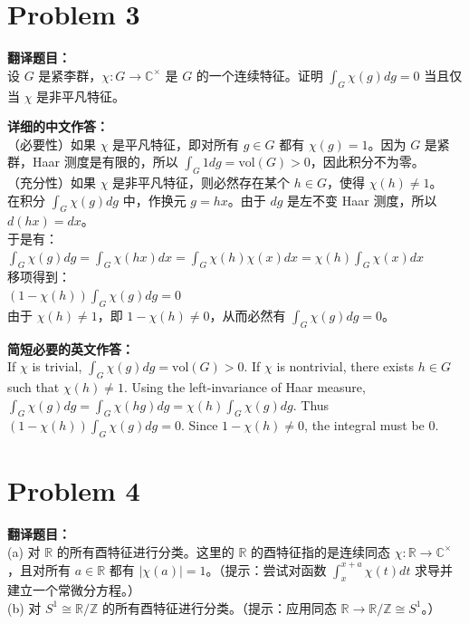 \documentclass{ctexart}
\begin{document}
\vspace{2em}
\section*{Problem 3}
\textbf{翻译题目：}\\
设 $G$ 是紧李群，$\chi: G \to \mathbb{C}^\times$ 是 $G$ 的一个连续特征。证明 $\int_G \chi(g) dg = 0$ 当且仅当 $\chi$ 是非平凡特征。

\vspace{1em}
\textbf{详细的中文作答：}\\
（必要性）如果 $\chi$ 是平凡特征，即对所有 $g \in G$ 都有 $\chi(g) = 1$。因为 $G$ 是紧群，Haar 测度是有限的，所以 $\int_G 1 dg = \text{vol}(G) > 0$，因此积分不为零。\\
（充分性）如果 $\chi$ 是非平凡特征，则必然存在某个 $h \in G$，使得 $\chi(h) \neq 1$。\\
在积分 $\int_G \chi(g) dg$ 中，作换元 $g = hx$。由于 $dg$ 是左不变 Haar 测度，所以 $d(hx) = dx$。\\
于是有：\\
$\int_G \chi(g) dg = \int_G \chi(hx) dx = \int_G \chi(h)\chi(x) dx = \chi(h) \int_G \chi(x) dx$\\
移项得到：\\
$(1 - \chi(h)) \int_G \chi(g) dg = 0$\\
由于 $\chi(h) \neq 1$，即 $1 - \chi(h) \neq 0$，从而必然有 $\int_G \chi(g) dg = 0$。

\vspace{1em}
\textbf{简短必要的英文作答：}\\
If $\chi$ is trivial, $\int_G \chi(g) dg = \text{vol}(G) > 0$. If $\chi$ is nontrivial, there exists $h \in G$ such that $\chi(h) \neq 1$. Using the left-invariance of Haar measure, $\int_G \chi(g) dg = \int_G \chi(hg) dg = \chi(h) \int_G \chi(g) dg$. Thus $(1-\chi(h))\int_G \chi(g) dg = 0$. Since $1-\chi(h) \neq 0$, the integral must be 0.

\vspace{2em}
\section*{Problem 4}
\textbf{翻译题目：}\\
(a) 对 $\mathbb{R}$ 的所有酉特征进行分类。这里的 $\mathbb{R}$ 的酉特征指的是连续同态 $\chi: \mathbb{R} \to \mathbb{C}^\times$，且对所有 $a \in \mathbb{R}$ 都有 $|\chi(a)| = 1$。（提示：尝试对函数 $\int_x^{x+a} \chi(t)dt$ 求导并建立一个常微分方程。）\\
(b) 对 $S^1 \cong \mathbb{R}/\mathbb{Z}$ 的所有酉特征进行分类。（提示：应用同态 $\mathbb{R} \to \mathbb{R}/\mathbb{Z} \cong S^1$。）
\end{document}
